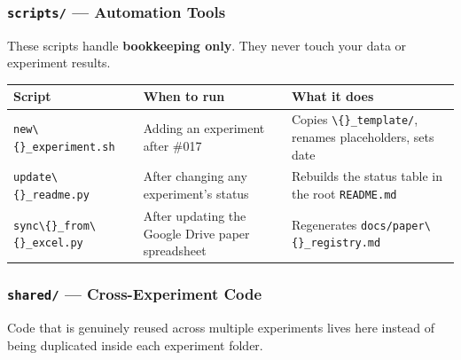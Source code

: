 \subsubsection{\texorpdfstring{\texttt{scripts/} --- Automation
Tools}{scripts/ --- Automation Tools}}\label{scripts-automation-tools}

These scripts handle \textbf{bookkeeping only}. They never touch your
data or experiment results.

{\def\LTcaptype{none} %
\small
\begin{longtable}[]{@{}
  >{\raggedright\arraybackslash}p{}
  >{\raggedright\arraybackslash}p{}
  >{\raggedright\arraybackslash}p{}@{}}
\toprule\noalign{}
\begin{minipage}[b]{\linewidth}\raggedright
Script
\end{minipage} & \begin{minipage}[b]{\linewidth}\raggedright
When to run
\end{minipage} & \begin{minipage}[b]{\linewidth}\raggedright
What it does
\end{minipage} \\
\midrule\noalign{}
\endhead
\bottomrule\noalign{}
\endlastfoot
\texttt{new\textbackslash\{\}\_experiment.sh} & Adding an experiment
after \#017 & Copies \texttt{\textbackslash\{\}\_template/}, renames
placeholders, sets date \\
\texttt{update\textbackslash\{\}\_readme.py} & After changing any
experiment's status & Rebuilds the status table in the root
\texttt{README.md} \\
\texttt{sync\textbackslash\{\}\_from\textbackslash\{\}\_excel.py} & After updating the
Google Drive paper spreadsheet & Regenerates
\texttt{docs/paper\textbackslash\{\}\_registry.md} \\
\end{longtable}
}

\subsubsection{\texorpdfstring{\texttt{shared/} --- Cross-Experiment
Code}{shared/ --- Cross-Experiment Code}}\label{shared-cross-experiment-code}

Code that is genuinely reused across multiple experiments lives here
instead of being duplicated inside each experiment folder.

